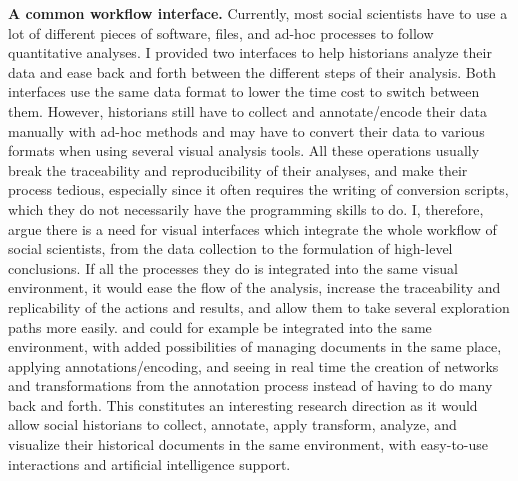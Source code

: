 \noindent\textbf{A common workflow interface.} Currently, most social scientists have to use a lot of different pieces of software, files, and ad-hoc processes to follow quantitative analyses.
I provided two \va interfaces to help historians analyze their data and ease back and forth between the different steps of their analysis.
Both interfaces use the same data format to lower the time cost to switch between them.
However, historians still have to collect and annotate/encode their data manually with ad-hoc methods and may have to convert their data to various formats when using several visual analysis tools.
All these operations usually break the traceability and reproducibility of their analyses, and make their process tedious, especially since it often requires the writing of conversion scripts, which they do not necessarily have the programming skills to do.
I, therefore, argue there is a need for visual interfaces which integrate the whole workflow of social scientists, from the data collection to the formulation of high-level conclusions.
If all the processes they do is integrated into the same visual environment, it would ease the flow of the analysis, increase the traceability and replicability of the actions and results, and allow them to take several exploration paths more easily.
\combinet and \pkclustering could for example be integrated into the same environment, with added possibilities of managing documents in the same place, applying annotations/encoding, and seeing in real time the creation of networks and transformations from the annotation process instead of having to do many back and forth.
This constitutes an interesting research direction as it would allow social historians to collect, annotate, apply transform, analyze, and visualize their historical documents in the same environment, with easy-to-use interactions and artificial intelligence support.





